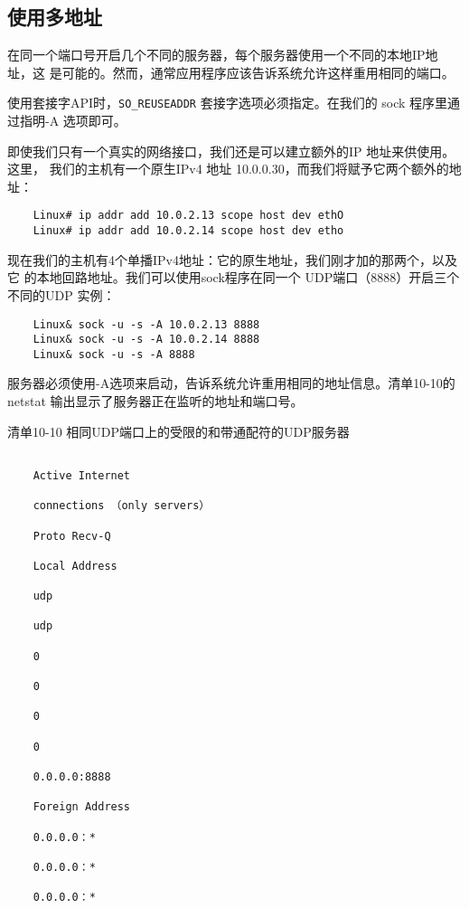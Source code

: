 \subsection{使用多地址}
在同一个端口号开启几个不同的服务器，每个服务器使用一个不同的本地IP地址，这
是可能的。然而，通常应用程序应该告诉系统允许这样重用相同的端口。

\begin{tcolorbox}
    使用套接字API时，\verb|SO_REUSEADDR| 套接字选项必须指定。在我们的
    sock 程序里通过指明-A 选项即可。
\end{tcolorbox}

即使我们只有一个真实的网络接口，我们还是可以建立额外的IP 地址来供使用。这里，
我们的主机有一个原生IPv4 地址 10.0.0.30，而我们将赋予它两个额外的地址：

\begin{verbatim}
    Linux# ip addr add 10.0.2.13 scope host dev ethO
    Linux# ip addr add 10.0.2.14 scope host dev etho
\end{verbatim}

现在我们的主机有4个单播IPv4地址：它的原生地址，我们刚才加的那两个，以及它
的本地回路地址。我们可以使用sock程序在同一个 UDP端口（8888）开启三个不同的UDP
实例：

\begin{verbatim}
    Linux& sock -u -s -A 10.0.2.13 8888
    Linux& sock -u -s -A 10.0.2.14 8888
    Linux& sock -u -s -A 8888
\end{verbatim}

服务器必须使用-A选项来启动，告诉系统允许重用相同的地址信息。清单10-10的
netstat 输出显示了服务器正在监听的地址和端口号。

清单10-10 相同UDP端口上的受限的和带通配符的UDP服务器
\begin{verbatim}
    
    Active Internet
    
    connections （only servers）
    
    Proto Recv-Q
    
    Local Address
    
    udp
    
    udp
    
    0
    
    0
    
    0
    
    0
    
    0.0.0.0:8888
    
    Foreign Address
    
    0.0.0.0：*
    
    0.0.0.0：*
    
    0.0.0.0：*
\end{verbatim}


